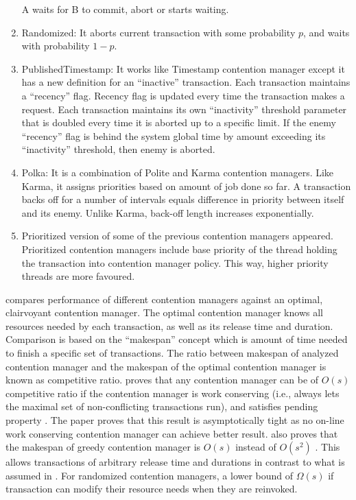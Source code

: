 \begin{enumerate}
A waits for B to commit, abort or starts waiting.
\item Randomized: It aborts current transaction with some probability $p$,
and waits with probability $1-p$.
\item PublishedTimestamp: It works like Timestamp contention manager except
it has a new definition for an {}``inactive'' transaction. Each
transaction maintains a {}``recency'' flag. Recency flag is updated
every time the transaction makes a request. Each transaction maintains
its own {}``inactivity'' threshold parameter that is doubled every
time it is aborted up to a specific limit. If the enemy {}``recency''
flag is behind the system global time by amount exceeding its {}``inactivity''
threshold, then enemy is aborted.
\item Polka: It is a combination of Polite and Karma contention managers.
Like Karma, it assigns priorities based on amount of job done so far.
A transaction backs off for a number of intervals equals difference
in priority between itself and its enemy. Unlike Karma, back-off length
increases exponentially.
\item Prioritized version of some of the previous contention managers appeared.
Prioritized contention managers include base priority of the thread
holding the transaction into contention manager policy. This way,
higher priority threads are more favoured.
\end{enumerate}
\cite{springerlink:10.1007/s00453-008-9195-x} compares performance
of different contention managers against an optimal, clairvoyant contention
manager. The optimal contention manager knows all resources needed
by each transaction, as well as its release time and duration. Comparison
is based on the {}``makespan'' concept which is amount of time needed
to finish a specific set of transactions. The ratio between makespan
of analyzed contention manager and the makespan of the optimal contention
manager is known as competitive ratio. \cite{springerlink:10.1007/s00453-008-9195-x}
proves that any contention manager can be of $O(s)$ competitive ratio
if the contention manager is work conserving (i.e., always lets the
maximal set of non-conflicting transactions run), and satisfies pending
property \cite{Guerraoui:2005:TTT:1073814.1073863}. The paper proves
that this result is asymptotically tight as no on-line work conserving
contention manager can achieve better result. \cite{springerlink:10.1007/s00453-008-9195-x}
also proves that the makespan of greedy contention manager is $O(s)$
instead of $O(s^{2})$ \cite{Guerraoui:2005:TTT:1073814.1073863}.
This allows transactions of arbitrary release time and durations in
contrast to what is assumed in \cite{Guerraoui:2005:TTT:1073814.1073863}.
For randomized contention managers, a lower bound of $\Omega(s)$
if transaction can modify their resource needs when they are reinvoked.

